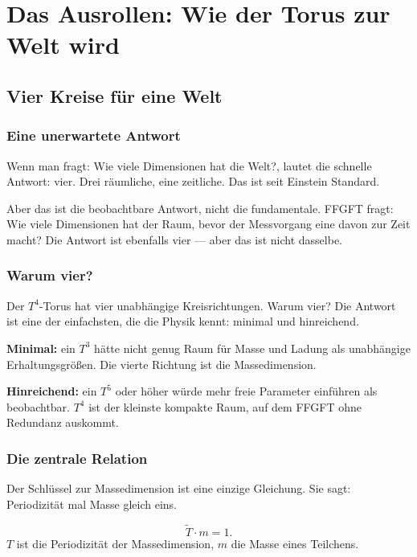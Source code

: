 \documentclass[12pt,oneside]{book}
\begin{document}
\part{Das Ausrollen: Wie der Torus zur Welt wird}

\chapter{Vier Kreise für eine Welt}

\section{Eine unerwartete Antwort}

Wenn man fragt: Wie viele Dimensionen hat die Welt?, lautet die schnelle Antwort: vier. Drei räumliche, eine zeitliche. Das ist seit Einstein Standard.

Aber das ist die beobachtbare Antwort, nicht die fundamentale. FFGFT fragt: Wie viele Dimensionen hat der Raum, bevor der Messvorgang eine davon zur Zeit macht? Die Antwort ist ebenfalls vier — aber das ist nicht dasselbe.

\section{Warum vier?}

Der $T^4$-Torus hat vier unabhängige Kreisrichtungen. Warum vier? Die Antwort ist eine der einfachsten, die die Physik kennt: minimal und hinreichend.

\textbf{Minimal:} ein $T^3$ hätte nicht genug Raum für Masse und Ladung als unabhängige Erhaltungsgrößen. Die vierte Richtung ist die Massedimension.

\textbf{Hinreichend:} ein $T^5$ oder höher würde mehr freie Parameter einführen als beobachtbar. $T^4$ ist der kleinste kompakte Raum, auf dem FFGFT ohne Redundanz auskommt.

\section{Die zentrale Relation}

Der Schlüssel zur Massedimension ist eine einzige Gleichung. Sie sagt: Periodizität mal Masse gleich eins.

\begin{merkbox}
\[
\tilde{T} \cdot m = 1.
\]
$T$ ist die Periodizität der Massedimension, $m$ die Masse eines Teilchens.
\end{merkbox}
\end{document}
